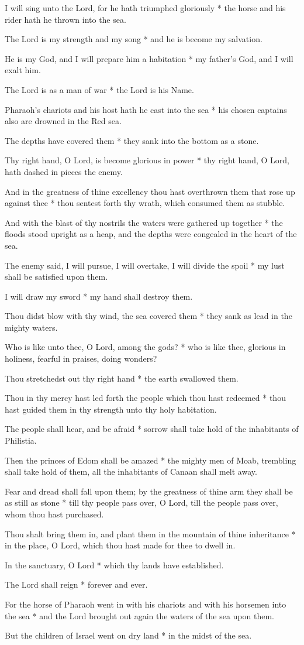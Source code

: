 I will sing unto the Lord, for he hath triumphed gloriously * the horse and his rider hath he thrown into the sea.

The Lord is my strength and my song * and he is become my salvation.

He is my God, and I will prepare him a habitation * my father's God, and I will exalt him.

The Lord is as a man of war * the Lord is his Name.

Pharaoh's chariots and his host hath he cast into the sea * his chosen captains also are drowned in the Red sea.

The depths have covered them * they sank into the bottom as a stone.

Thy right hand, O Lord, is become glorious in power * thy right hand, O Lord, hath dashed in pieces the enemy.

And in the greatness of thine excellency thou hast overthrown them that rose up against thee * thou sentest forth thy wrath, which consumed them as stubble.

And with the blast of thy nostrils the waters were gathered up together * the floods stood upright as a heap, and the depths were congealed in the heart of the sea.

The enemy said, I will pursue, I will overtake, I will divide the spoil * my lust shall be satisfied upon them.

I will draw my sword * my hand shall destroy them.

Thou didst blow with thy wind, the sea covered them * they sank as lead in the mighty waters.

Who is like unto thee, O Lord, among the gods? * who is like thee, glorious in holiness, fearful in praises, doing wonders?

Thou stretchedst out thy right hand * the earth swallowed them.

Thou in thy mercy hast led forth the people which thou hast redeemed * thou hast guided them in thy strength unto thy holy habitation.

The people shall hear, and be afraid * sorrow shall take hold of the inhabitants of Philistia.

Then the princes of Edom shall be amazed * the mighty men of Moab, trembling shall take hold of them, all the inhabitants of Canaan shall melt away.

Fear and dread shall fall upon them; by the greatness of thine arm they shall be as still as stone * till thy people pass over, O Lord, till the people pass over, whom thou hast purchased.

Thou shalt bring them in, and plant them in the mountain of thine inheritance * in the place, O Lord, which thou hast made for thee to dwell in.

In the sanctuary, O Lord * which thy lands have established.

The Lord shall reign * forever and ever.

For the horse of Pharaoh went in with his chariots and with his horsemen into the sea * and the Lord brought out again the waters of the sea upon them.

But the children of Israel went on dry land * in the midst of the sea.